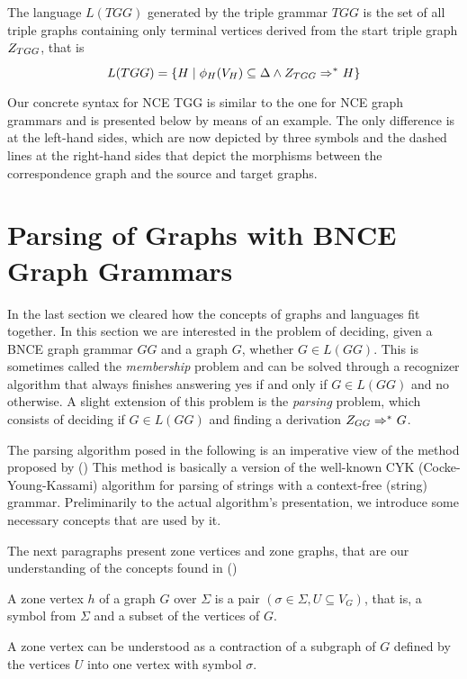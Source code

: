 \documentclass[]{report}
\begin{document}
\begin{definition}
	The language $L(TGG)$ generated by the triple grammar $TGG$ is the set of all triple graphs containing only terminal vertices derived from the start triple graph $Z_{TGG}$, that is
	\[
	L(TGG) = \{H \st \phi_H(V_H) \subseteq \Delta \land \startTG{TGG} \tderivtr{}{}{} H\}
	\]
\end{definition}

Our concrete syntax for NCE TGG is similar to the one for NCE graph grammars and is presented below by means of an example. The only difference is at the left-hand sides, which are now depicted by three symbols and the dashed lines at the right-hand sides that depict the morphisms between the correspondence graph and the source and target graphs.


%


\section{Parsing of Graphs with BNCE Graph Grammars}
In the last section we cleared how the concepts of graphs and languages fit together. In this section we are interested in the problem of deciding, given a BNCE graph grammar $GG$ and a graph $G$, whether $G \in L(GG)$. This is sometimes called the \textit{membership} problem and can be solved through a recognizer algorithm that always finishes answering yes if and only if $G \in L(GG)$ and no otherwise. A slight extension of this problem is the \textit{parsing} problem, which consists of deciding if $G \in L(GG)$ and finding a derivation $\startG{GG} \derivtr{}{}{} G$.

The parsing algorithm posed in the following is an imperative view of the method proposed by ()%
This method is basically a version of the well-known CYK (Cocke-Young-Kassami) algorithm for parsing of strings with a context-free (string) grammar. Preliminarily to the actual algorithm's presentation, we introduce some necessary concepts that are used by it.


The next paragraphs present zone vertices and zone graphs, that are our understanding of the concepts found in () %

\begin{definition}
	A zone vertex $h$ of a graph $G$ over $\Sigma$ is a pair $(\sigma \in \Sigma, U \subseteq V_G)$, that is, a symbol from $\Sigma$ and a subset of the vertices of $G$.
	
	A zone vertex can be understood as a contraction of a subgraph of $G$ defined by the vertices $U$ into one vertex with symbol $\sigma$.
\end{definition}
\end{document}

